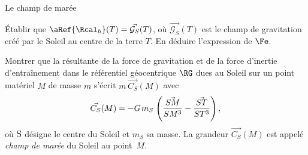 \begin{exo}[PC][2][TD]{Le champ de marée}
\begin{quest}

  \item Établir que $\aRef{\Rcal_h}(T) = \Vec {{\mathcal{G}_S}} (T)$, où $\Vec {{\mathcal{G}_S}} (T)$ est le champ de gravitation créé par le Soleil au centre de la terre $T$.  En déduire l’expression de $\Fe$.


  \item\label{quest:fmaree}  Montrer que la résultante de la force de gravitation et de la force d'inertie d'entraînement dans le référentiel géocentrique $\RG$  dues au Soleil sur un point matériel $M$ de masse $m$ s'écrit 
  $m\,\Vec {{C_S}} (M)$  avec
  \begin{equation}
    \Vec {{C_S}} (M) = -G{\kern 1pt} {m_S}{\kern 1pt} \left( {\frac{{\Vec {SM} }}{{S{M^3}}} - \frac{{\Vec {ST} }}{{S{T^3}}}} \right),
  \end{equation}
  où $\rm S$ désigne le centre du Soleil et $m_S$ sa masse.
   La grandeur $\Vec {{C_S}} (M)$ est appelé \emph{champ de marée} du Soleil au point~$M$.

  \end{quest}


\end{exo}
